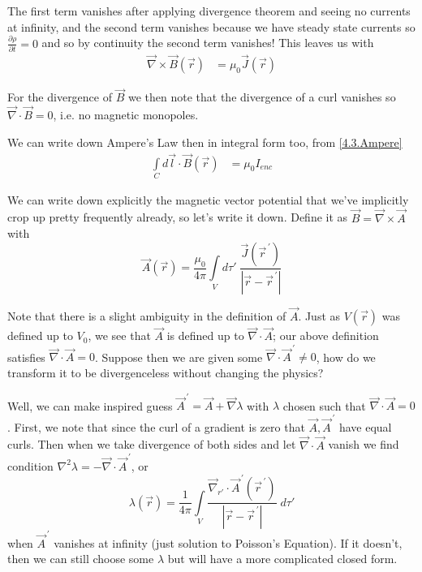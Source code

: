 \documentclass[10pt]{report}
\newcommand{\pd}[2]{\frac{\partial #1}{\partial#2}}
\newcommand{\pvec}[1]{\vec{#1}^{\,\prime}}
\newcommand{\abs}[1]{\left|#1\right|}
\begin{document}
The first term vanishes after applying divergence theorem and seeing no currents at infinity, and the second term vanishes because we have steady state currents so $\pd{\rho}{t} = 0$ and so by continuity the second term vanishes! This leaves us with
\begin{align}
    \vec{\nabla}\times\vec{B}(\vec{r}) &= \mu_0\vec{J}(\vec{r})\label{4.3.Ampere}
\end{align}

For the divergence of $\vec{B}$ we then note that the divergence of a curl vanishes so $\vec{\nabla}\cdot \vec{B} = 0$, i.e. no magnetic monopoles. 

We can write down Ampere's Law then in integral form too, from \eqref{4.3.Ampere}
\begin{align}
    \int\limits_{C}^{}d\vec{l}\cdot\vec{B}(\vec{r}) &= \mu_0 I_{enc}
\end{align}

We can write down explicitly the magnetic vector potential that we've implicitly crop up pretty frequently already, so let's write it down. Define it as $\vec{B} = \vec{\nabla}\times\vec{A}$ with
\begin{equation}
    \vec{A}(\vec{r}) = \frac{\mu_0}{4\pi}\int\limits_{V}d\tau'\;\frac{\vec{J}(\pvec{r})}{\abs{\vec{r} - \pvec{r}}}\label{4.3.A}
\end{equation}

Note that there is a slight ambiguity in the definition of $\vec{A}$. Just as $V(\vec{r})$ was defined up to $V_0$, we see that $\vec{A}$ is defined up to $\vec{\nabla}\cdot\vec{A}$; our above definition satisfies $\vec{\nabla} \cdot \vec{A} = 0$. Suppose then we are given some $\vec{\nabla}\cdot\pvec{A} \neq 0$, how do we transform it to be divergenceless without changing the physics? 

Well, we can make inspired guess $\pvec{A} = \vec{A} + \vec{\nabla}\lambda$ with $\lambda$ chosen such that $\vec{\nabla}\cdot\vec{A} = 0$. First, we note that since the curl of a gradient is zero that $\vec{A}, \pvec{A}$ have equal curls. Then when we take divergence of both sides and let $\vec{\nabla}\cdot\vec{A}$ vanish we find condition $\nabla^2 \lambda = -\vec{\nabla}\cdot \pvec{A}$, or
\begin{equation}
    \lambda(\vec{r}) = \frac{1}{4\pi} \int\limits_{V}^{}\frac{\vec{\nabla}_{r'} \cdot \pvec{A}(\pvec{r})}{\abs{\vec{r} - \pvec{r}}}\;d\tau'
\end{equation}
when $\pvec{A}$ vanishes at infinity (just solution to Poisson's Equation). If it doesn't, then we can still choose some $\lambda$ but will have a more complicated closed form.
\end{document}
